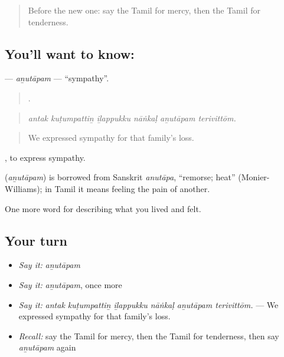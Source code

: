 \label{lesson:TA-C457-anutapam}



\begin{quote}
Before the new one: say the Tamil for mercy, then the Tamil for tenderness.
\end{quote}

\subsection*{You'll want to know: }
\textbf{} — \emph{aṉutāpam} — \textquotedblleft{}sympathy\textquotedblright{}.

\begin{quote}
     .
\end{quote}

\begin{quote}
\emph{antak kuṭumpattiṉ iḻappukku nāṅkaḷ aṉutāpam terivittōm.}
\end{quote}

\begin{quote}
We expressed sympathy for that family’s loss.
\end{quote}

 , to express sympathy.

\begin{cousinweb}
\textbf{} (\emph{aṉutāpam}) is borrowed from Sanskrit \emph{anutāpa}, \textquotedblleft{}remorse; heat\textquotedblright{} (Monier-Williams); in Tamil it means feeling the pain of another.
\end{cousinweb}

\begin{grammarlens}[title={What you've built}]
One more word for describing what you lived and felt.
\end{grammarlens}

\subsection*{Your turn}
\begin{itemize}
\raggedright
  \item \emph{Say it:} \emph{aṉutāpam}
  \item \emph{Say it:} \emph{aṉutāpam}, once more
  \item \emph{Say it:} \emph{antak kuṭumpattiṉ iḻappukku nāṅkaḷ aṉutāpam terivittōm.} — We expressed sympathy for that family’s loss.
  \item \emph{Recall:} say the Tamil for mercy, then the Tamil for tenderness, then say \emph{aṉutāpam} again
\end{itemize}

